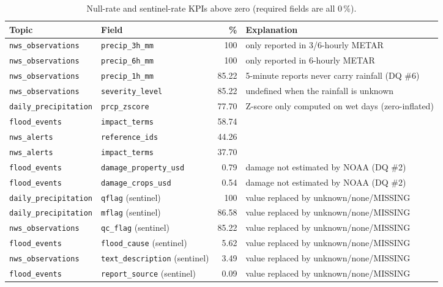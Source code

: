 \begin{table}[H]\centering\scriptsize
\caption{Null-rate and sentinel-rate KPIs above zero (required fields are all 0\,\%).}\label{tab:govnull}
\begin{tabular}{@{}llrp{6.2cm}@{}}\toprule
Topic & Field & \% & Explanation\\\midrule
\texttt{nws\_observations} & \texttt{precip\_3h\_mm} & 100 & only reported in 3/6-hourly METAR\\
\texttt{nws\_observations} & \texttt{precip\_6h\_mm} & 100 & only reported in 6-hourly METAR\\
\texttt{nws\_observations} & \texttt{precip\_1h\_mm} & 85.22 & 5-minute reports never carry rainfall (DQ \#6)\\
\texttt{nws\_observations} & \texttt{severity\_level} & 85.22 & undefined when the rainfall is unknown\\
\texttt{daily\_precipitation} & \texttt{prcp\_zscore} & 77.70 & Z-score only computed on wet days (zero-inflated)\\
\texttt{flood\_events} & \texttt{impact\_terms} & 58.74 & \\
\texttt{nws\_alerts} & \texttt{reference\_ids} & 44.26 & \\
\texttt{nws\_alerts} & \texttt{impact\_terms} & 37.70 & \\
\texttt{flood\_events} & \texttt{damage\_property\_usd} & 0.79 & damage not estimated by NOAA (DQ \#2)\\
\texttt{flood\_events} & \texttt{damage\_crops\_usd} & 0.54 & damage not estimated by NOAA (DQ \#2)\\
\texttt{daily\_precipitation} & \texttt{qflag} (sentinel) & 100 & value replaced by unknown/none/MISSING\\
\texttt{daily\_precipitation} & \texttt{mflag} (sentinel) & 86.58 & value replaced by unknown/none/MISSING\\
\texttt{nws\_observations} & \texttt{qc\_flag} (sentinel) & 85.22 & value replaced by unknown/none/MISSING\\
\texttt{flood\_events} & \texttt{flood\_cause} (sentinel) & 5.62 & value replaced by unknown/none/MISSING\\
\texttt{nws\_observations} & \texttt{text\_description} (sentinel) & 3.49 & value replaced by unknown/none/MISSING\\
\texttt{flood\_events} & \texttt{report\_source} (sentinel) & 0.09 & value replaced by unknown/none/MISSING\\
\bottomrule\end{tabular}\end{table}